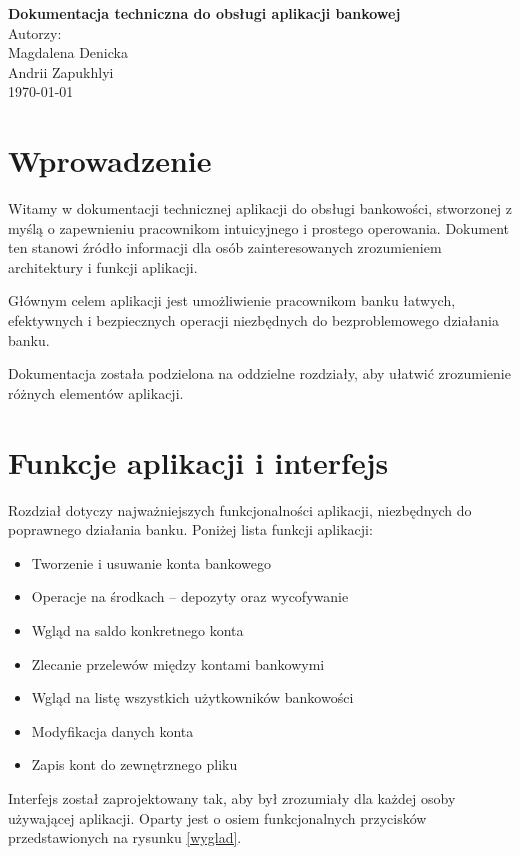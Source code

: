 \documentclass[a4paper,12pt]{article}
\begin{document}
	\begin{titlepage}
		\centering
		\vspace*{1cm}
		\Huge \textbf{Dokumentacja techniczna do obsługi aplikacji bankowej}\\
		
		\vspace{1.5cm}
		\vspace{10cm}
		\Large Autorzy: \\Magdalena Denicka\\ Andrii Zapukhlyi \\
		\vspace{2cm}
\today
		\vfill
	\end{titlepage}
	
	\tableofcontents
	\newpage
	

	\section{Wprowadzenie}
	
	Witamy w dokumentacji technicznej aplikacji do obsługi bankowości, stworzonej z myślą o zapewnieniu pracownikom intuicyjnego i prostego operowania. Dokument ten stanowi źródło informacji dla osób zainteresowanych zrozumieniem architektury i funkcji aplikacji.
	
	Głównym celem aplikacji jest umożliwienie pracownikom banku łatwych, efektywnych i bezpiecznych operacji niezbędnych do bezproblemowego działania banku.
	
	Dokumentacja została podzielona na oddzielne rozdziały, aby ułatwić zrozumienie różnych elementów aplikacji. 
	
	\section{Funkcje aplikacji i interfejs}
	Rozdział dotyczy najważniejszych funkcjonalności aplikacji, niezbędnych do poprawnego działania banku. Poniżej lista funkcji aplikacji:
	\begin{itemize}
		\item Tworzenie i usuwanie konta bankowego
		\item Operacje na środkach – depozyty oraz wycofywanie
		\item Wgląd na saldo konkretnego konta
		\item Zlecanie przelewów między kontami bankowymi
		\item Wgląd na listę wszystkich użytkowników bankowości
		\item Modyfikacja danych konta
		\item Zapis kont do zewnętrznego pliku
	\end{itemize}
Interfejs został zaprojektowany tak, aby był zrozumiały dla każdej osoby używającej aplikacji. 
Oparty jest o osiem funkcjonalnych przycisków przedstawionych na rysunku \ref{wyglad}.
\end{document}

